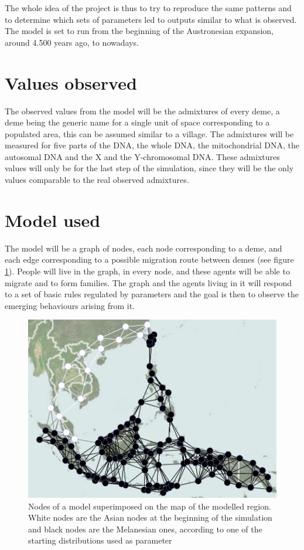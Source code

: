 \documentclass[a4paper,12pt]{report}
\begin{document}
The whole idea of the project is thus to try to reproduce the same patterns and to determine which sets of parameters led to outputs similar to what is observed. The model is set to run from the beginning of the Austronesian expansion, around 4.500 years ago, to nowadays.

\section{Values observed}
The observed values from the model will be the admixtures of every deme, a deme being the generic name for a single unit of space corresponding to a populated area, this can be assumed similar to a village. The admixtures will be measured for five parts of the DNA, the whole DNA, the mitochondrial DNA, the autosomal DNA and the X and the Y-chromosomal DNA. These admixtures values will only be for the last step of the simulation, since they will be the only values comparable to the real observed admixtures.

\section{Model used}
The model will be a graph of nodes, each node corresponding to a deme, and each edge corresponding to a possible migration route between demes (see figure \ref{nodesOnMap}). People will live in the graph, in every node, and these agents will be able to migrate and to form families. The graph and the agents living in it will respond to a set of basic rules regulated by parameters and the goal is then to observe the emerging behaviours arising from it.

\begin{figure}[!htbp]
	\hspace*{-1cm}
	\includegraphics[scale=0.5]{../data/ISEA-node-map.png}
	\caption{Nodes of a model superimposed on the map of the modelled region. White nodes are the Asian nodes at the beginning of the simulation and black nodes are the Melanesian ones, according to one of the starting distributions used as parameter}
	\label{nodesOnMap}
\end{figure}
\end{document}
